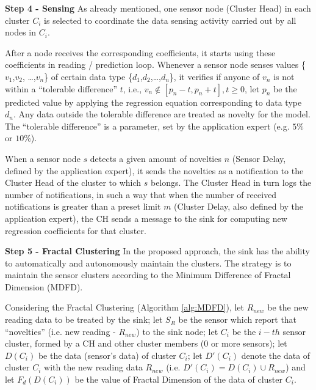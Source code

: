 \documentclass{acm_proc_article-sp}
\begin{document}
{\bf Step 4 - Sensing}
As already mentioned, one sensor node (Cluster Head) in each cluster $C_{i}$ is
selected to coordinate the data sensing activity carried out by all nodes in
$C_{i}$.
\vspace*{-.3cm}

After a node receives the corresponding coefficients, it starts using these
coefficients in reading / prediction loop.
Whenever a sensor node senses values \{$v_{1}$,$v_{2}$, \ldots,$v_{n}$\} of
certain data type \{$d_{1}$,$d_{2}$,\ldots,$d_{n}$\}, it verifies if anyone of
$v_{n}$ is not within a ``tolerable difference'' $t$, i.e., $v_{n} \not \in
[p_{n}-t,p_{n}+t], t \geq 0$, let $p_{n}$ be the predicted value by applying
the regression equation corresponding to data type $d_{n}$. Any data outside the
tolerable difference are treated as novelty for the model.
The ``tolerable difference'' is a parameter, set by the application expert (e.g.
$5\%$ or $10\%$).
\vspace*{-.3cm}

When a sensor node $s$ detects a given amount of novelties $n$ (Sensor Delay,
defined by the application expert), it sends the novelties as a notification to
the Cluster Head of the cluster to which $s$ belongs. The Cluster Head in turn
logs the number of notifications, in such a way that when the number of received
notifications is greater than a preset limit $m$ (Cluster Delay, also
defined by the application expert), the CH sends a message to the sink for
computing new regression coefficients for that cluster.
\vspace*{-.3cm}

{\bf Step 5 - Fractal Clustering}
In the proposed approach, the sink has the ability to automatically and
autonomously maintain the clusters. The strategy is to maintain the sensor
clusters according to the Minimum Difference of Fractal Dimension (MDFD).
\vspace*{-.3cm}

Considering the Fractal Clustering (Algorithm \ref{alg:MDFD}), let $R_{new}$ be
the new reading data to be treated by the sink; let $S_{R}$ be the sensor which
report that ``novelties'' (i.e. new reading - $R_{new}$) to the sink node; let
$C_i$ be the $i-th$ sensor cluster, formed by a CH and other cluster members (0
or more sensors); let $D(C_i)$ be the data (sensor's data) of cluster $C_i$; let
$D'(C_i)$ denote the data of cluster $C_i$ with the new reading data $R_{new}$
(i.e. $D'(C_i) = D(C_i) \cup R_{new}$) and let $F_{d}(D(C_i))$ be the value of
Fractal Dimension of the data of cluster $C_i$.
\vspace*{-.3cm}
\end{document}
